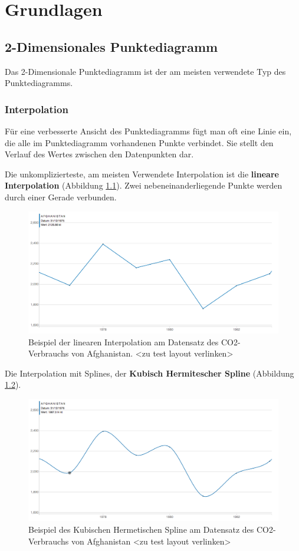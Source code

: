 \chapter{Grundlagen}

\section{2-Dimensionales Punktediagramm}
Das 2-Dimensionale Punktediagramm ist der am meisten verwendete Typ des Punktediagramms.

\subsection{Interpolation}
Für eine verbesserte Ansicht des Punktediagramms fügt man oft eine Linie ein, die alle im Punktediagramm vorhandenen Punkte verbindet. Sie stellt den Verlauf des Wertes zwischen den Datenpunkten dar.

Die unkomplizierteste, am meisten Verwendete Interpolation ist die \textbf{lineare Interpolation} (Abbildung \ref{fig:linear}). Zwei nebeneinanderliegende Punkte werden durch einer Gerade verbunden.

\begin{figure}[htbp]
	\centering
	\includegraphics[width=0.80\linewidth]{images/linear}
	\caption[Lineare Interpolation]{Beispiel der linearen Interpolation am Datensatz des CO2-Verbrauchs von Afghanistan. <zu test layout verlinken>}
	\label{fig:linear}
\end{figure}

Die Interpolation mit Splines, der \textbf{Kubisch Hermitescher Spline} (Abbildung \ref{fig:cardinal}).

\begin{figure}[htbp]
	\centering
	\includegraphics[width=0.80\linewidth]{images/cardinal}
	\caption[Kubischer Hermitescher Spline]{Beispiel des Kubischen Hermetischen Spline am Datensatz des CO2-Verbrauchs von Afghanistan <zu test layout verlinken>}
	\label{fig:cardinal}
\end{figure}

